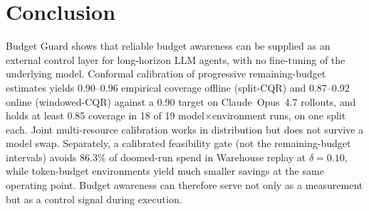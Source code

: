 \documentclass{article}
\begin{document}
\section{Conclusion}
\label{sec:conclusion}

Budget Guard shows that reliable budget awareness can be supplied as an external control layer for long-horizon LLM agents, with no fine-tuning of the underlying model. Conformal calibration of progressive remaining-budget estimates yields 0.90--0.96 empirical coverage offline (split-CQR) and 0.87--0.92 online (windowed-CQR) against a 0.90 target on Claude~Opus~4.7 rollouts, and holds at least 0.85 coverage in 18 of 19 model$\times$environment runs, on one split each. Joint multi-resource calibration works in distribution but does not survive a model swap. Separately, a calibrated feasibility gate (not the remaining-budget intervals) avoids 86.3\% of doomed-run spend in Warehouse replay at $\delta{=}0.10$, while token-budget environments yield much smaller savings at the same operating point. Budget awareness can therefore serve not only as a measurement but as a control signal during execution.

\begin{ack}
\end{ack}
\end{document}
